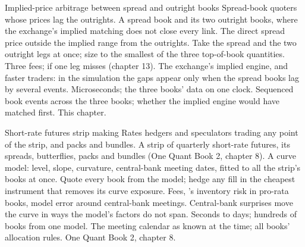 \begin{strategyfile}{Implied-price arbitrage between spread and outright books}\label{strat:hf:futures-market-making:implied}
 Spread-book quoters whose prices lag the outrights.
 A spread book and its two outright books, where the exchange's implied matching does not close every link.
 The direct spread price outside the implied range from the outrights.
 Take the spread and the two outright legs at once; size to the smallest of the three top-of-book quantities.
 Three fees;  if one leg misses (chapter 13).
 The exchange's implied engine, and faster traders: in the simulation the gaps appear only when the spread books lag by several
events.
 Microseconds; the three books' data on one clock.
 Sequenced book events across the three books; whether the implied engine would have matched first.
 This chapter.
\end{strategyfile}

\begin{strategyfile}{Short-rate futures strip making}\label{strat:hf:futures-market-making:strip}
 Rates hedgers and speculators trading any point of the strip, and packs and bundles.
 A strip of quarterly short-rate futures, its spreads, butterflies, packs and bundles (One Quant Book 2, chapter 8).
 A curve model: level, slope, curvature, central-bank meeting dates, fitted to all the strip's books at once.
 Quote every book from the model; hedge any fill in the cheapest instrument that removes its curve exposure.
 Fees, 's inventory risk in pro-rata books, model error around central-bank meetings.
 Central-bank surprises move the curve in ways the model's factors do not span.
 Seconds to days; hundreds of books from one model.
 The meeting calendar as known at the time; all books' allocation rules.
 One Quant Book 2, chapter 8.
\end{strategyfile}

